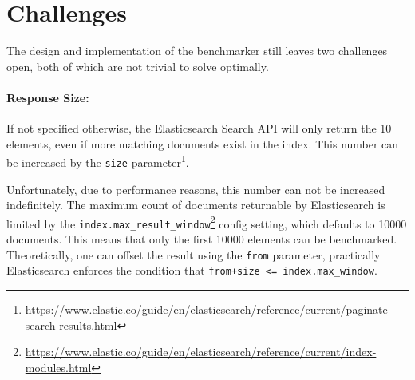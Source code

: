 \section{Challenges}
The design and implementation of the benchmarker still leaves two challenges open, both of which are not trivial to solve optimally.

\paragraph{Response Size:} If not specified otherwise, the Elasticsearch Search API will only return the 10 elements, even if more matching documents exist in the index. This number can be increased by the \texttt{size} parameter\footnote{\url{https://www.elastic.co/guide/en/elasticsearch/reference/current/paginate-search-results.html}}.

Unfortunately, due to performance reasons, this number can not be increased indefinitely. The maximum count of documents returnable by Elasticsearch is limited by the \texttt{index.max\_result\_window}\footnote{\url{https://www.elastic.co/guide/en/elasticsearch/reference/current/index-modules.html}} config setting, which defaults to 10000 documents. This means that only the first 10000 elements can be benchmarked. Theoretically, one can offset the result using the \texttt{from} parameter, practically Elasticsearch enforces the condition that \texttt{from+size <= index.max\_window}.\\

